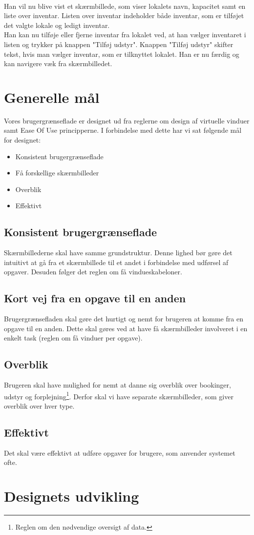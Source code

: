 \\Han vil nu blive vist et skærmbillede, som viser lokalets navn, kapacitet samt en liste over inventar. Listen over inventar indeholder både inventar, som er tilføjet det valgte lokale og ledigt inventar.
\\Han kan nu tilføje eller fjerne inventar fra lokalet ved, at han vælger inventaret i listen og trykker på knappen "Tilføj udstyr". Knappen "Tilføj udstyr" skifter tekst, hvis man vælger inventar, som er tilknyttet lokalet. Han er nu færdig og kan navigere væk fra skærmbilledet.

\section{Generelle mål}
\label{Design_G_Goals}
Vores brugergrænseflade er designet ud fra reglerne om design af virtuelle vinduer\cite[s. 169]{SL_UID} samt Ease Of Use principperne\cite[s. 9]{SL_UID}. I forbindelse med dette har vi sat følgende mål for designet:
\begin{itemize}
\item Konsistent brugergrænseflade
\item Få forskellige skærmbilleder
\item Overblik
\item Effektivt
\end{itemize}

\subsection{Konsistent brugergrænseflade}
Skærmbillederne skal have samme grundstruktur. Denne lighed bør gøre det intuitivt at gå fra et skærmbillede til et andet i forbindelse med udførsel af opgaver. Desuden følger det reglen om få vindueskabeloner.

\subsection{Kort vej fra en opgave til en anden}
Brugergrænsefladen skal gøre det hurtigt og nemt for brugeren at komme fra en opgave til en anden. Dette skal gøres ved at have få skærmbilleder involveret i en enkelt task (reglen om få vinduer per opgave).

\subsection{Overblik}
Brugeren skal have mulighed for nemt at danne sig overblik over bookinger, udstyr og forplejning\footnote{Reglen om den nødvendige oversigt af data.}. Derfor skal vi have separate skærmbilleder, som giver overblik over hver type.

\subsection{Effektivt}
Det skal være effektivt at udføre opgaver for brugere, som anvender systemet ofte.

\section{Designets udvikling}
\label{Design_G_du}
